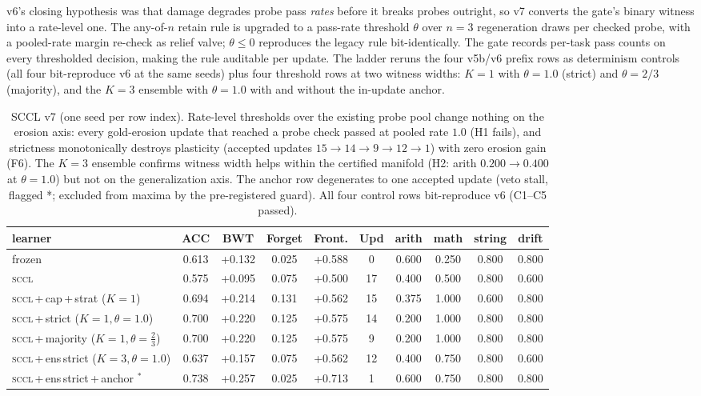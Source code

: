 \documentclass[10pt,conference]{IEEEtran}
\begin{document}
v6's closing hypothesis was that damage degrades probe pass \emph{rates} before it breaks probes outright, so v7 converts the gate's binary witness into a rate-level one. The any-of-$n$ retain rule is upgraded to a pass-rate threshold $\theta$ over $n=3$ regeneration draws per checked probe, with a pooled-rate margin re-check as relief valve; $\theta\leq 0$ reproduces the legacy rule bit-identically. The gate records per-task pass counts on every thresholded decision, making the rule auditable per update. The ladder reruns the four v5b/v6 prefix rows as determinism controls (all four bit-reproduce v6 at the same seeds) plus four threshold rows at two witness widths: $K{=}1$ with $\theta=1.0$ (strict) and $\theta=2/3$ (majority), and the $K{=}3$ ensemble with $\theta=1.0$ with and without the in-update anchor.

\begin{table}[t]
\centering
\small
\caption{SCCL v7 (one seed per row index). Rate-level thresholds over the existing probe pool change nothing on the erosion axis: every gold-erosion update that reached a probe check passed at pooled rate $1.0$ (H1 fails), and strictness monotonically destroys plasticity (accepted updates $15\to14\to9\to12\to1$) with zero erosion gain (F6). The $K{=}3$ ensemble confirms witness width helps within the certified manifold (H2: arith $0.200\to0.400$ at $\theta{=}1.0$) but not on the generalization axis. The anchor row degenerates to one accepted update (veto stall, flagged *; excluded from maxima by the pre-registered guard). All four control rows bit-reproduce v6 (C1--C5 passed).}
\label{tab:v7}
\begin{tabular}{lccccccccc}
\toprule
learner & ACC & BWT & Forget & Front. & Upd & arith & math & string & drift \\
\midrule
frozen                     & 0.613 & +0.132 & 0.025 & +0.588 & 0  & 0.600 & 0.250 & 0.800 & 0.800 \\
\textsc{sccl}              & 0.575 & +0.095 & 0.075 & +0.500 & 17 & 0.400 & 0.500 & 0.800 & 0.600 \\
\textsc{sccl}\,+\,cap\,+\,strat ($K{=}1$)        & 0.694 & +0.214 & 0.131 & +0.562 & 15 & 0.375 & 1.000 & 0.600 & 0.800 \\
\textsc{sccl}\,+\,strict ($K{=}1,\theta{=}1.0$)  & 0.700 & +0.220 & 0.125 & +0.575 & 14 & 0.200 & 1.000 & 0.800 & 0.800 \\
\textsc{sccl}\,+\,majority ($K{=}1,\theta{=}\tfrac{2}{3}$) & 0.700 & +0.220 & 0.125 & +0.575 & 9 & 0.200 & 1.000 & 0.800 & 0.800 \\
\textsc{sccl}\,+\,ens\,strict ($K{=}3,\theta{=}1.0$)       & 0.637 & +0.157 & 0.075 & +0.562 & 12 & 0.400 & 0.750 & 0.800 & 0.600 \\
\textsc{sccl}\,+\,ens\,strict\,+\,anchor $^*$   & 0.738 & +0.257 & 0.025 & +0.713 & 1  & 0.600 & 0.750 & 0.800 & 0.800 \\
\bottomrule
\end{tabular}
\end{table}
\end{document}
